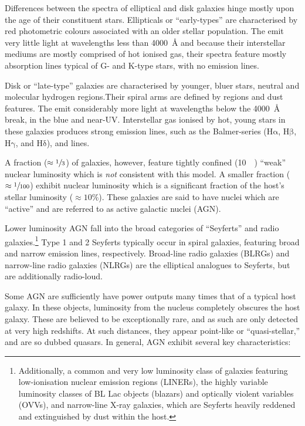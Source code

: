 \documentclass[a4paper,11pt]{article}
\begin{document}
Differences between the spectra of elliptical and disk galaxies hinge mostly upon the age of their constituent stars. Ellipticals or ``early-types'' are characterised by red photometric colours associated with an older stellar population. The emit very little light at wavelengths less than \SI{4000}{\angstrom} and because their interstellar mediums are mostly comprised of hot ionised gas, their spectra feature mostly absorption lines typical of G- and K-type stars, with no emission lines.\cite{Mo_2010}

Disk or ``late-type'' galaxies are characterised by younger, bluer stars, neutral  and molecular  hydrogen regions.Their spiral arms are defined by  regions and dust features. The emit considerably more light at wavelengths below the \SI{4000}{\angstrom} break, in the blue and near-UV. Interstellar gas ionised by hot, young stars in these galaxies produces strong emission lines, such as the Balmer-series ($\mathrm{H\alpha}$, $\mathrm{H\beta}$, $\mathrm{H\gamma}$, and $\mathrm{H\delta}$),  and  lines.\cite{Mo_2010}

A fraction ($\approx \sfrac{1}{3}$) of galaxies, however, feature tightly confined (\SI{10}{\kilo\parsec}) ``weak'' nuclear luminosity which is \textit{not} consistent with this model.\cite{McClure_2019} A smaller fraction ($\approx \sfrac{1}{100}$) exhibit nuclear luminosity which is a significant fraction of the host's stellar luminosity ($\approx 10\%$).\cite{Sparke_2000} These galaxies are said to have nuclei which are ``active'' and are referred to as active galactic nuclei (AGN).\cite{Peterson_1997}

Lower luminosity AGN fall into the broad categories of ``Seyferts'' and radio galaxies.\footnote{Additionally, a common and very low luminosity class of galaxies featuring low-ionisation nuclear emission regions (LINERs), the highly variable luminosity classes of BL Lac objects (blazars) and optically violent variables (OVVs), and narrow-line X-ray galaxies, which are Seyferts heavily reddened and extinguished by dust within the host.} Type 1 and 2 Seyferts typically occur in spiral galaxies, featuring broad and narrow emission lines, respectively. Broad-line radio galaxies (BLRGs) and narrow-line radio galaxies (NLRGs) are the elliptical analogues to Seyferts, but are additionally radio-loud.\cite{Peterson_1997}

Some AGN are sufficiently have power outputs many times that of a typical host galaxy. In these objects, luminosity from the nucleus completely obscures the host galaxy. These are believed to be exceptionally rare, and as such are only detected at very high redshifts. At such distances, they appear point-like or  ``quasi-stellar,'' and are so dubbed quasars.\cite{Peterson_1997} In general, AGN exhibit several key characteristics:
\end{document}
